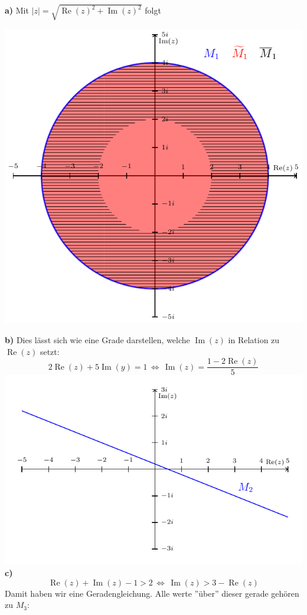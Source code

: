 \documentclass[a4paper,graphics,11pt]{article}
\newcommand{\re}{\operatorname{Re}}
\newcommand{\im}{\operatorname{Im}}
\begin{document}
\textbf{a)}
Mit $|z| = \sqrt{\re(z)^2+\im(z)^2}$ folgt
\begin{center}
    \includegraphics{graphics/graph1.pdf}
\end{center}
\textbf{b)}
Dies lässt sich wie eine Grade darstellen, welche $\im(z)$ in Relation zu $\re(z)$ setzt:
$$
    2\re(z) + 5\im(y) = 1
    \,\Longleftrightarrow\, \im(z) = \frac{1-2\re(z)}{5}
$$
\qquad\qquad\qquad\includegraphics{graphics/graph2.pdf}
\newpage
\textbf{c)}
$$
    \re(z) + \im(z) -1 > 2
    \,\Longleftrightarrow\, \im(z) > 3-\re(z)
$$
Damit haben wir eine Geradengleichung. Alle werte ''über'' dieser gerade gehören zu $M_3$:\\
\end{document}
